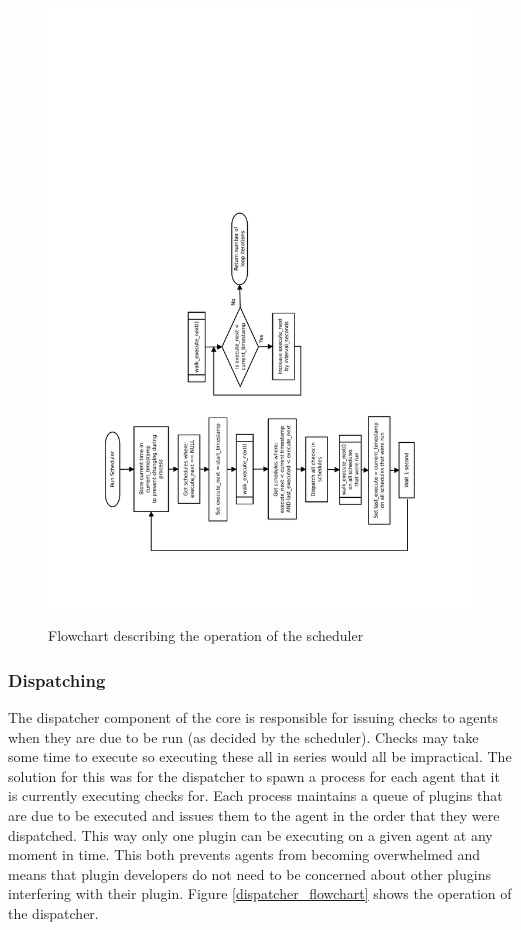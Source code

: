 \documentclass[bsc,logo,twoside,parskip,singlespacing,notimes]{infthesis}
\begin{document}
\begin{figure}[H]
	\caption{Flowchart describing the operation of the scheduler}
	\includegraphics[scale=0.7, angle=-90]{assets/scheduler_flowchart.pdf}
	\label{scheduler_flowchart}
\end{figure}


\subsubsection{Dispatching}

	The dispatcher component of the core is responsible for issuing checks to
	agents when they are due to be run (as decided by the scheduler).  Checks may
	take some time to execute so executing these all in series would all be
	impractical. The solution for this was for the dispatcher to spawn a process
	for each agent that it is currently executing checks for.  Each process
	maintains a queue of plugins that are due to be executed and issues them to the
	agent in the order that they were dispatched.  This way only one plugin can be
	executing on a given agent at any moment in time.  This both prevents agents
	from becoming overwhelmed and means that plugin developers do not need to be
	concerned about other plugins interfering with their plugin.  Figure
	\ref{dispatcher_flowchart} shows the operation of the dispatcher.
\end{document}
